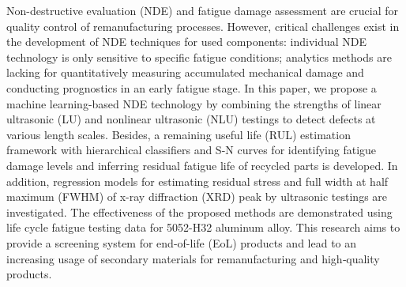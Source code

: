 Non-destructive evaluation (NDE) and fatigue damage assessment are crucial for quality control of remanufacturing processes. However, critical challenges exist in the development of NDE techniques for used components: individual NDE technology is only sensitive to specific fatigue conditions; analytics methods are lacking for quantitatively measuring accumulated mechanical damage and conducting prognostics in an early fatigue stage. In this paper, we propose a machine learning-based NDE technology by combining the strengths of linear ultrasonic (LU) and nonlinear ultrasonic (NLU) testings to detect defects at various length scales. Besides, a remaining useful life (RUL) estimation framework with hierarchical classifiers and S-N curves for identifying fatigue damage levels and inferring residual fatigue life of recycled parts is developed. In addition, regression models for estimating residual stress and full width at half maximum (FWHM) of x-ray diffraction (XRD) peak by ultrasonic testings are investigated. The effectiveness of the proposed methods are demonstrated using life cycle fatigue testing data for 5052-H32 aluminum alloy. This research aims to provide a screening system for end-of-life (EoL) products and lead to an increasing usage of secondary materials for remanufacturing and high‐quality products.